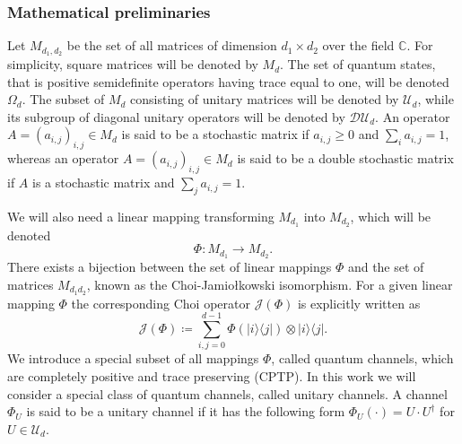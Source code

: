 \documentclass[preprint,12pt, a4paper]{elsarticle}
\newcommand{\ket}[1]{\ensuremath{|#1\rangle}}
\newcommand{\bra}[1]{\ensuremath{\langle#1|}}
\newcommand{\ketbra}[2]{\ensuremath{\ket{#1}\bra{#2}}}
\newcommand{\1}{{\rm 1\hspace{-0.9mm}l}}
\newcommand{\DD}{\mathcal{D}}
\newcommand{\UU}{\mathcal{U}}
\newcommand{\HH}{\mathcal{H}}
\begin{document}
\subsubsection{Mathematical preliminaries}



Let $M_{d_1,d_2}$ be the set of all matrices of dimension $d_1 \times d_2$ over
the field $\mathbb{C}$. For  simplicity, square matrices will be denoted by
$M_d$.  
The set of quantum states, that is
positive semidefinite operators having trace equal to one, will be denoted
$\Omega_d$. 
 The subset of $M_d$ consisting of unitary matrices will be denoted
by $\UU_d$, while its subgroup of diagonal unitary operators will be denoted by
$\DD \UU_d$. 
	An operator $A = \left( a_{i,j}\right)_{i,j} \in M_d$ is said to be a stochastic matrix if $a_{i,j} \ge 0$   and $\sum_{i} a_{i,j} = 1$, whereas an operator $A = \left( a_{i,j}\right)_{i,j} \in M_d$ is said to be a double stochastic matrix if $A$ is a stochastic matrix and $\sum_{j} a_{i,j} = 1$.


 We will also need a linear mapping transforming $M_{d_1}$ into
$M_{d_2}$, which will be denoted 
\begin{equation}
\Phi: M_{d_1 } \rightarrow M_{d_2}.
\end{equation} 
There
exists a bijection between the set of linear mappings $\Phi$ and the set of matrices $M_{d_1d_2}$,  known as the Choi-Jamio{\l}kowski isomorphism. 
For a given linear mapping $\Phi$ the corresponding Choi operator $\mathcal{J}(\Phi)$ is explicitly written as 
\begin{equation}
\mathcal{J}(\Phi) \coloneqq \sum_{i,j=0}^{d- 1} \Phi(\ketbra{i}{j}) \otimes \ketbra{i}{j}. \end{equation}
We introduce a special subset of all mappings $\Phi$, called quantum channels, which are completely positive
and trace preserving (CPTP).
In this work we will consider a special class of quantum channels, called unitary channels.  A 
channel
$\Phi_{U}$ is said to be a unitary channel if it has the following form $\Phi_U(\cdot) = U \cdot U^\dagger$ for  $U \in 
\UU_d$.
\end{document}
